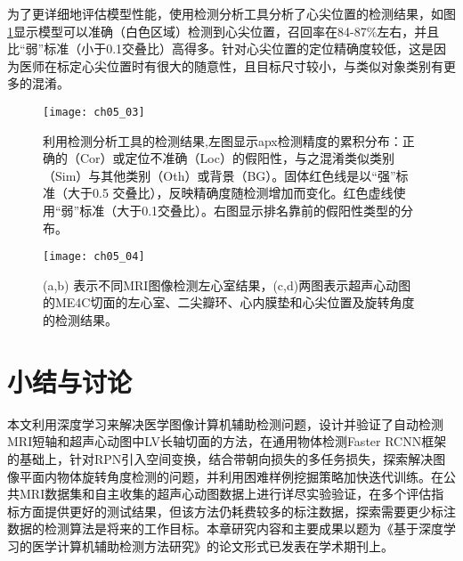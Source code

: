 为了更详细地评估模型性能，使用检测分析工具\citep{Hoiem2012}分析了心尖位置的检测结果，如图\ref{fig:ch05_03}显示模型可以准确（白色区域）检测到心尖位置，召回率在84-87\%左右，并且比“弱”标准（小于0.1交叠比）高得多。针对心尖位置的定位精确度较低，这是因为医师在标定心尖位置时有很大的随意性，且目标尺寸较小，与类似对象类别有更多的混淆。
\begin{figure}[!htbp]
\centering
\texttt{[image: ch05\_03]}
\caption[利用检测分析工具\citep{Hoiem2012}的检测结果]{利用检测分析工具\citep{Hoiem2012}的检测结果,左图显示apx检测精度的累积分布：正确的（Cor）或定位不准确（Loc）的假阳性，与之混淆类似类别（Sim）与其他类别（Oth）或背景（BG）。固体红色线是以“强”标准（大于0.5 交叠比），反映精确度随检测增加而变化。红色虚线使用“弱”标准（大于0.1交叠比）。右图显示排名靠前的假阳性类型的分布。}
\label{fig:ch05_03}
\end{figure} 	                          
 
\begin{figure}[!htbp]
\centering
\texttt{[image: ch05\_04]}
\caption[医学图像目标检测结果示意图]{(a,b) 表示不同MRI图像检测左心室结果，(c,d)两图表示超声心动图的ME4C切面的左心室、二尖瓣环、心内膜垫和心尖位置及旋转角度的检测结果。}
\label{fig:ch05_04}
\end{figure} 	                         
 
\section{小结与讨论}

本文利用深度学习来解决医学图像计算机辅助检测问题，设计并验证了自动检测MRI短轴和超声心动图中LV长轴切面的方法，在通用物体检测Faster RCNN框架的基础上，针对RPN引入空间变换，结合带朝向损失的多任务损失，探索解决图像平面内物体旋转角度检测的问题，并利用困难样例挖掘策略加快迭代训练。在公共MRI数据集和自主收集的超声心动图数据上进行详尽实验验证，在多个评估指标方面提供更好的测试结果，但该方法仍耗费较多的标注数据，探索需要更少标注数据的检测算法是将来的工作目标。本章研究内容和主要成果以题为《基于深度学习的医学计算机辅助检测方法研究》的论文形式已发表在学术期刊上\citep{tao2018}。